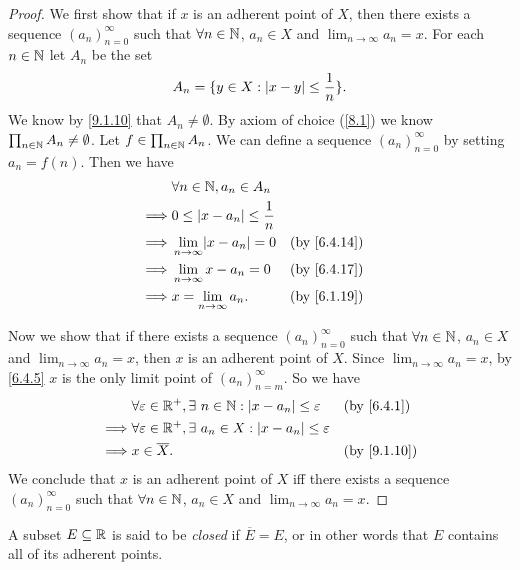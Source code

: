 \begin{proof}
  We first show that if \(x\) is an adherent point of \(X\), then there exists a sequence \((a_n)_{n = 0}^\infty\) such that \(\forall n \in \mathbb{N}\), \(a_n \in X\) and \(\lim_{n \to \infty} a_n = x\).
  For each \(n \in \mathbb{N}\) let \(A_n\) be the set
  \[
    A_n = \{y \in X : \left\lvert x - y\right\rvert \leq \dfrac{1}{n}\}.
  \]
  We know by \cref{9.1.10} that \(A_n \neq \emptyset\).
  By axiom of choice (\cref{8.1}) we know \(\prod_{n \in \mathbb{N}} A_n \neq \emptyset\).
  Let \(f \in \prod_{n \in \mathbb{N}} A_n\).
  We can define a sequence \((a_n)_{n = 0}^\infty\) by setting \(a_n = f(n)\).
  Then we have
  \begin{align*}
             & \forall n \in \N, a_n \in A_n                                         \\
    \implies & 0 \leq \abs{x - a_n} \leq \dfrac{1}{n}                                \\
    \implies & \lim_{n \to \infty} \abs{x - a_n} = 0  &  & \text{(by \cref{6.4.14})} \\
    \implies & \lim_{n \to \infty} x - a_n = 0        &  & \text{(by \cref{6.4.17})} \\
    \implies & x = \lim_{n \to \infty} a_n.           &  & \text{(by \cref{6.1.19})}
  \end{align*}

  Now we show that if there exists a sequence \((a_n)_{n = 0}^\infty\) such that \(\forall n \in \mathbb{N}\), \(a_n \in X\) and \(\lim_{n \to \infty} a_n = x\), then \(x\) is an adherent point of \(X\).
  Since \(\lim_{n \to \infty} a_n = x\), by \cref{6.4.5} \(x\) is the only limit point of \((a_n)_{n = m}^\infty\).
  So we have
  \begin{align*}
             & \forall \varepsilon \in \R^+, \exists\ n \in \N : \abs{x - a_n} \leq \varepsilon  &  & \text{(by \cref{6.4.1})}  \\
    \implies & \forall \varepsilon \in \R^+, \exists\ a_n \in X : \abs{x - a_n} \leq \varepsilon                                \\
    \implies & x \in \overline{X}.                                                               &  & \text{(by \cref{9.1.10})}
  \end{align*}
  We conclude that \(x\) is an adherent point of \(X\) iff there exists a sequence \((a_n)_{n = 0}^\infty\) such that \(\forall n \in \mathbb{N}\), \(a_n \in X\) and \(\lim_{n \to \infty} a_n = x\).
\end{proof}

\begin{defn}\label{9.1.15}
  A subset \(E \subseteq \mathbb{R}\) is said to be \emph{closed} if \(\overline{E} = E\), or in other words that \(E\) contains all of its adherent points.
\end{defn}

